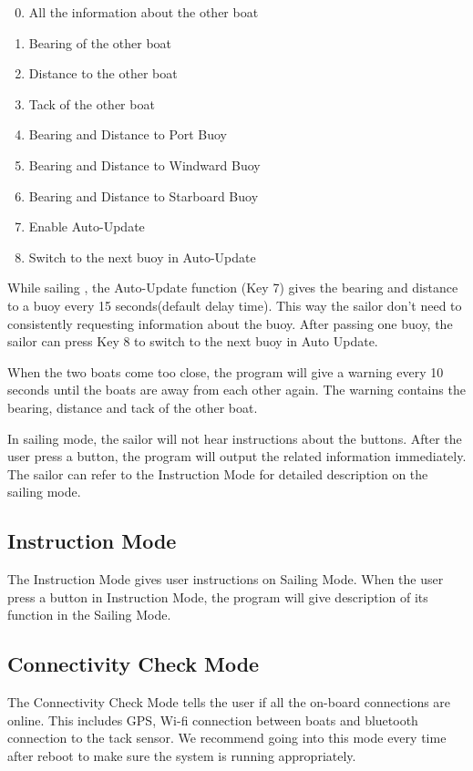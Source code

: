 \documentclass[11pt]{article}
\begin{document}
\begin{enumerate}
\setcounter{enumi}{-1}
\item All the information about the other boat
\item Bearing of the other boat
\item Distance to the other boat
\item Tack of the other boat
\item Bearing and Distance to Port Buoy
\item Bearing and Distance to Windward Buoy
\item Bearing and Distance to Starboard Buoy
\item Enable Auto-Update
\item Switch to the next buoy in Auto-Update
\end{enumerate}

While sailing , the Auto-Update function (Key 7) gives the bearing and distance to a buoy every 15 seconds(default delay time). This way the sailor don't need to consistently requesting information about the buoy. After passing one buoy, the sailor can press Key 8 to switch to the next buoy in Auto Update.

When the two boats come too close, the program will give a warning every 10 seconds until the boats are away from each other again. The warning contains the bearing, distance and tack of the other boat. 

In sailing mode, the sailor will not hear instructions about the buttons. After the user press a button, the program will output the related information immediately. The sailor can refer to the Instruction Mode for detailed description on the sailing mode.

\subsection{Instruction Mode}

The Instruction Mode gives user instructions on Sailing Mode. When the user press a button in Instruction Mode, the program will give description of its function in the Sailing Mode.

\subsection{Connectivity Check Mode}

The Connectivity Check Mode tells the user if all the on-board connections are online. This includes GPS, Wi-fi connection between boats and bluetooth connection to the tack sensor. We recommend going into this mode every time after reboot to make sure the system is running appropriately. 
\end{document}
